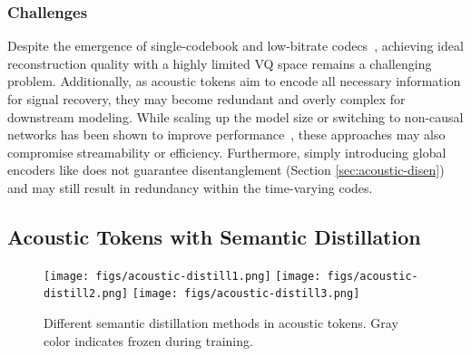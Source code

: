 \subsubsection{Challenges}
Despite the emergence of single-codebook and low-bitrate codecs~\cite{singlecodec,ji2024wavtokenizer,xin2024bigcodec,guo2024lscodec}, achieving ideal reconstruction quality with a highly limited VQ space remains a challenging problem. 
Additionally, as acoustic tokens aim to encode all necessary information for signal recovery, they may become redundant and overly complex for downstream modeling.
While scaling up the model size or switching to non-causal networks has been shown to improve performance~\cite{singlecodec,xin2024bigcodec,parker2024scalingtransformerslowbitratehighquality}, these approaches may also compromise streamability or efficiency.
Furthermore, simply introducing global encoders like \cite{jiang2023disentangled,ticodec,guo2024speaking} does not guarantee disentanglement (Section \ref{sec:acoustic-disen}) and may still result in redundancy within the time-varying codes.

\subsection{Acoustic Tokens with Semantic Distillation}
\label{sec:acoustic-distillation}

\begin{figure}
    \centering
    \texttt{[image: figs/acoustic-distill1.png]}
    \texttt{[image: figs/acoustic-distill2.png]}
    \texttt{[image: figs/acoustic-distill3.png]}
    \caption{Different semantic distillation methods in acoustic tokens. Gray color indicates frozen during training.}
    \label{fig:acoustic-distill}
    \vspace{-0.2in}
\end{figure}

